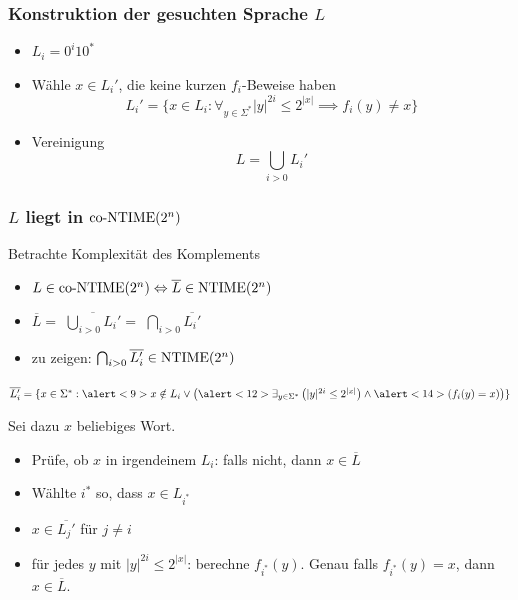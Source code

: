 \begin{frame}
  \frametitle{Konstruktion der gesuchten Sprache \(L\)}

  \begin{itemize}
    \item<1-> \(L_i = 0^i10^*\)
    \item<2-> Wähle \(x \in L_i'\), die keine kurzen \(f_i\)-Beweise haben
              \[L_i' = \{ x \in L_i : \forall_{y \in \Sigma^*} |y|^{2i} \leq 2^{|x|} \implies f_i(y) \neq x \}\]
    \item<3-> Vereinigung
              \[L = \bigcup_{i>0} L_i' \]
  \end{itemize}
\end{frame}

\begin{frame}
  \frametitle{\(L\) liegt in \(\text{co-NTIME}(2^n)\)}

  Betrachte Komplexität des Komplements
  
  \begin{itemize}
   \item<2-> \(L \in \text{co-NTIME}(2^n) \Leftrightarrow \overline{L} \in \text{NTIME}(2^n)\)
   \item<3-> \(\overline{L} = \)  \( \overline{ \bigcup_{i>0} L_i' } = \)  \( \bigcap_{i>0} \overline{L_i'}\)
   \item<6-> zu zeigen: \( \bigcap_{i>0} \overline{L_i'} \in \text{NTIME}(2^n)\)
  \end{itemize}

  
  \(\overline{L_i'} = \{ x \in \Sigma^* : \alert<9>{ x \notin L_i } \vee \left( \alert<12>{ \exists_{y \in \Sigma^*} \left( |y|^{2i} \leq 2^{|x|} \right) } \wedge \alert<14>{ \left( f_i(y) = x \right) } \right)  \}\)

   Sei dazu \(x\) beliebiges Wort.

  \begin{itemize}
   \item<8-> Prüfe, ob \(x\) in irgendeinem \(L_i\):  \alert<9>{falls nicht, dann \(x \in \overline{L}\) }
   \item<10-> Wählte \(i^*\) so, dass \(x \in L_{i^*}\)
   \item<11-> \(x \in \overline{L_j'}\) für \(j \neq i\)
   \item<12-> \alert<12>{für jedes \(y\) mit \(|y|^{2i} \leq 2^{|x|}\)}:  berechne \(f_{i^*}(y)\).  \alert<14>{Genau falls \(f_{i^*}(y) = x\), dann \(x \in \overline{L}\).}
  \end{itemize}

\end{frame}


